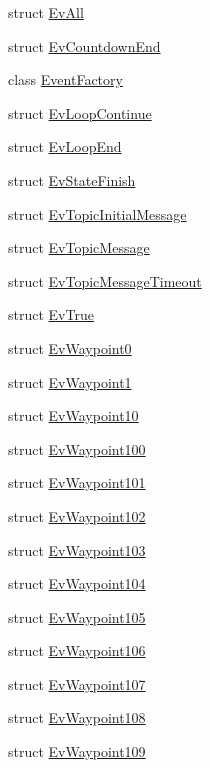\begin{DoxyCompactItemize}
\item 
struct \hyperlink{structsmacc_1_1EvAll}{Ev\+All}
\item 
struct \hyperlink{structsmacc_1_1EvCountdownEnd}{Ev\+Countdown\+End}
\item 
class \hyperlink{classsmacc_1_1EventFactory}{Event\+Factory}
\item 
struct \hyperlink{structsmacc_1_1EvLoopContinue}{Ev\+Loop\+Continue}
\item 
struct \hyperlink{structsmacc_1_1EvLoopEnd}{Ev\+Loop\+End}
\item 
struct \hyperlink{structsmacc_1_1EvStateFinish}{Ev\+State\+Finish}
\item 
struct \hyperlink{structsmacc_1_1EvTopicInitialMessage}{Ev\+Topic\+Initial\+Message}
\item 
struct \hyperlink{structsmacc_1_1EvTopicMessage}{Ev\+Topic\+Message}
\item 
struct \hyperlink{structsmacc_1_1EvTopicMessageTimeout}{Ev\+Topic\+Message\+Timeout}
\item 
struct \hyperlink{structsmacc_1_1EvTrue}{Ev\+True}
\item 
struct \hyperlink{structsmacc_1_1EvWaypoint0}{Ev\+Waypoint0}
\item 
struct \hyperlink{structsmacc_1_1EvWaypoint1}{Ev\+Waypoint1}
\item 
struct \hyperlink{structsmacc_1_1EvWaypoint10}{Ev\+Waypoint10}
\item 
struct \hyperlink{structsmacc_1_1EvWaypoint100}{Ev\+Waypoint100}
\item 
struct \hyperlink{structsmacc_1_1EvWaypoint101}{Ev\+Waypoint101}
\item 
struct \hyperlink{structsmacc_1_1EvWaypoint102}{Ev\+Waypoint102}
\item 
struct \hyperlink{structsmacc_1_1EvWaypoint103}{Ev\+Waypoint103}
\item 
struct \hyperlink{structsmacc_1_1EvWaypoint104}{Ev\+Waypoint104}
\item 
struct \hyperlink{structsmacc_1_1EvWaypoint105}{Ev\+Waypoint105}
\item 
struct \hyperlink{structsmacc_1_1EvWaypoint106}{Ev\+Waypoint106}
\item 
struct \hyperlink{structsmacc_1_1EvWaypoint107}{Ev\+Waypoint107}
\item 
struct \hyperlink{structsmacc_1_1EvWaypoint108}{Ev\+Waypoint108}
\item 
struct \hyperlink{structsmacc_1_1EvWaypoint109}{Ev\+Waypoint109}
\item 

\end{DoxyCompactItemize}

